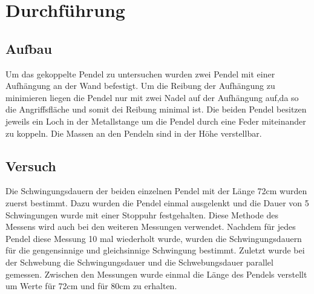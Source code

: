 \section{Durchführung}
\label{sec:Durchfuehrung}
\subsection{Aufbau}
    Um das gekoppelte Pendel zu untersuchen wurden zwei Pendel mit einer Aufhängung an der Wand befestigt.
    Um die Reibung der Aufhängung zu minimieren liegen die Pendel nur mit zwei Nadel auf der Aufhängung auf,da so die Angriffsfläche und somit dei Reibung minimal ist.
    Die beiden Pendel besitzen jeweils ein Loch in der Metallstange um die Pendel durch eine Feder miteinander zu koppeln.
    Die Massen an den Pendeln sind in der Höhe verstellbar.
\subsection{Versuch}
    Die Schwingungsdauern der beiden einzelnen Pendel mit der Länge 72cm wurden zuerst bestimmt.
    Dazu wurden die Pendel einmal ausgelenkt und die Dauer von 5 Schwingungen wurde mit einer Stoppuhr festgehalten.
    Diese Methode des Messens wird auch bei den weiteren Messungen verwendet.
    Nachdem für jedes Pendel diese Messung 10 mal wiederholt wurde, wurden die Schwingungsdauern für die gengensinnige und gleichsinnige Schwingung bestimmt.
    Zuletzt wurde bei der Schwebung die Schwingungsdauer und die Schwebungsdauer parallel gemessen.
    Zwischen den Messungen wurde einmal die Länge des Pendels verstellt um Werte für 72cm und für 80cm zu erhalten.